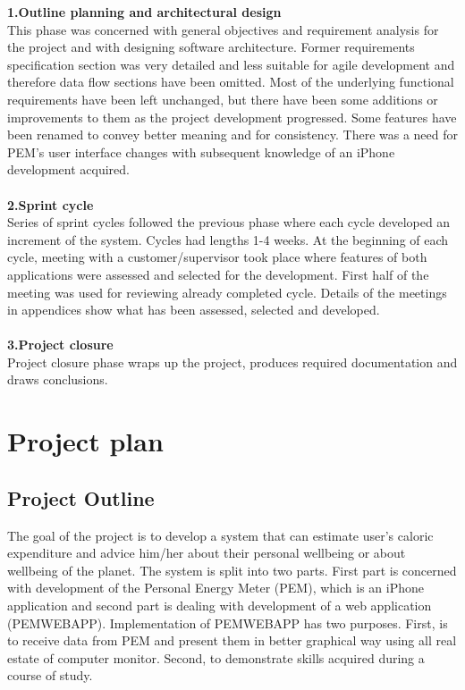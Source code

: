 \documentclass[12pt, a4paper]{report}   %
\begin{document}
\textbf{1.Outline planning and architectural design}\\
This phase was concerned with general objectives and requirement analysis for the project and with designing software architecture. Former requirements specification section was very detailed and less suitable for agile development and therefore data flow sections have been omitted. Most of the underlying functional requirements have been left unchanged, but there have been some additions or improvements to them as the project development progressed. Some features have been renamed to convey better meaning and for consistency. There was a need for PEM's user interface changes with subsequent knowledge of an iPhone development acquired. \\ \\
\textbf{2.Sprint cycle}\\
Series of sprint cycles followed the previous phase where each cycle developed an increment of the system. Cycles had lengths 1-4 weeks. At the beginning of each cycle, meeting with a customer/supervisor took place where features of both applications were assessed and selected for the development. First half of the meeting was used for reviewing already completed cycle. Details of the meetings in appendices show what has been assessed, selected and developed.\\ \\
\textbf{3.Project closure}\\
Project closure phase wraps up the project, produces required documentation and draws conclusions.


\clearpage
\section{Project plan}
\subsection{Project Outline}
The goal of the project is to develop a system that can estimate user's caloric expenditure and advice him/her about their personal wellbeing or about wellbeing of the planet.
The system is split into two parts. First part is concerned with development of the Personal Energy Meter (PEM), which is an iPhone application and second part is dealing with development of a web application (PEMWEBAPP). Implementation of PEMWEBAPP has two purposes. First, is to receive data from PEM and present them in better graphical way using all real estate of computer monitor. Second, to demonstrate skills acquired during a course of study.
\end{document}
